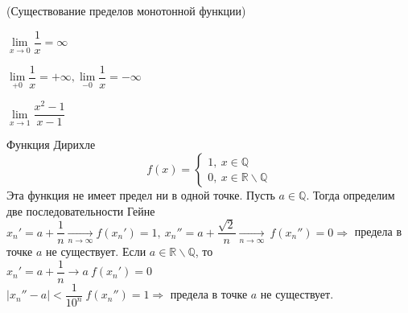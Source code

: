 \begin{multicols}{2}
\begin{theorema}{(Существование пределов монотонной функции)}{}
\end{theorema}
\Ex \begin{enumerate*}
	\item $\lim\limits_{x\to 0} \dfrac{1}{x} = \infty$
	\item $\lim\limits_{+0} \dfrac{1}{x} = + \infty, \lim\limits_{-0} \dfrac{1}{x} = -\infty$
	\item $\lim\limits_{x\to1} \dfrac{x^2-1}{x-1}$
	\item Функция Дирихле \[
		f(x) = \begin{cases}
			1,\ x \in\mathbb Q\\0,\ x\in \mathbb R\backslash\mathbb Q
		\end{cases}
	\] Эта функция не имеет предел ни в одной точке. Пусть $a\in\mathbb Q$. Тогда определим две последовательности Гейне\\ $x_n' = a + \dfrac{1}{n}\underset{n\to\infty}{\to} f(x_n') = 1,\ x_n'' = a + \dfrac{\sqrt{2}}{n} \underset{n\to\infty}{\to}\ f(x_n'') = 0 \Rightarrow$ предела в точке $a$ не существует. Если $a \in\mathbb R\backslash\mathbb Q$, то \\$x_n' = a + \dfrac{1}{n} \to a\ f(x_n') = 0$\\$|x_n''-a| < \dfrac{1}{10^n}\ f(x_n'') = 1 \Rightarrow $ предела в точке $a$ не существует.
\end{enumerate*}

\end{multicols}
